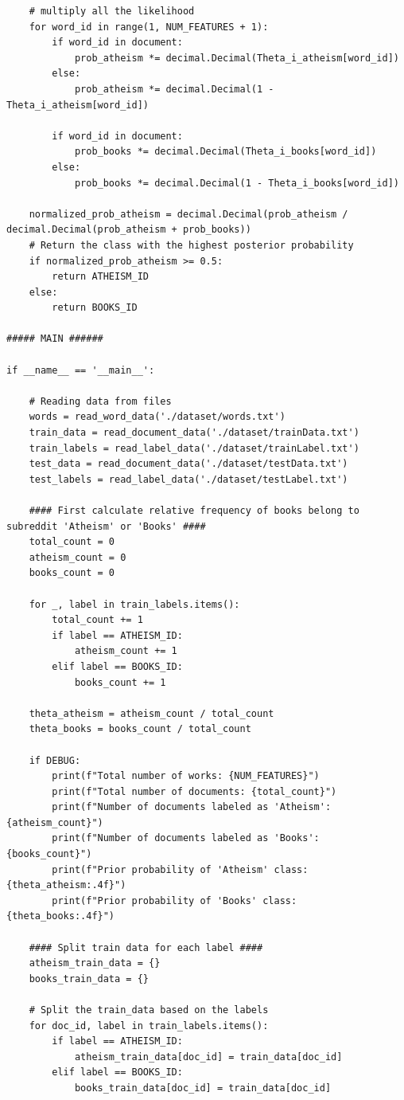 \documentclass[12pt]{article}
\begin{document}
\begin{enumerate}
\begin{lstlisting}
    # multiply all the likelihood
    for word_id in range(1, NUM_FEATURES + 1):
        if word_id in document:
            prob_atheism *= decimal.Decimal(Theta_i_atheism[word_id])
        else:
            prob_atheism *= decimal.Decimal(1 - Theta_i_atheism[word_id])
            
        if word_id in document:
            prob_books *= decimal.Decimal(Theta_i_books[word_id])
        else:
            prob_books *= decimal.Decimal(1 - Theta_i_books[word_id])
    
    normalized_prob_atheism = decimal.Decimal(prob_atheism / decimal.Decimal(prob_atheism + prob_books))
    # Return the class with the highest posterior probability
    if normalized_prob_atheism >= 0.5:
        return ATHEISM_ID
    else:
        return BOOKS_ID

##### MAIN ######

if __name__ == '__main__':
    
    # Reading data from files
    words = read_word_data('./dataset/words.txt')
    train_data = read_document_data('./dataset/trainData.txt')
    train_labels = read_label_data('./dataset/trainLabel.txt')
    test_data = read_document_data('./dataset/testData.txt')
    test_labels = read_label_data('./dataset/testLabel.txt')
    
    #### First calculate relative frequency of books belong to subreddit 'Atheism' or 'Books' ####
    total_count = 0
    atheism_count = 0
    books_count = 0

    for _, label in train_labels.items():
        total_count += 1
        if label == ATHEISM_ID:
            atheism_count += 1
        elif label == BOOKS_ID:
            books_count += 1
    
    theta_atheism = atheism_count / total_count
    theta_books = books_count / total_count
    
    if DEBUG:
        print(f"Total number of works: {NUM_FEATURES}")
        print(f"Total number of documents: {total_count}")
        print(f"Number of documents labeled as 'Atheism': {atheism_count}")
        print(f"Number of documents labeled as 'Books': {books_count}")
        print(f"Prior probability of 'Atheism' class: {theta_atheism:.4f}")
        print(f"Prior probability of 'Books' class: {theta_books:.4f}")
    
    #### Split train data for each label ####
    atheism_train_data = {}
    books_train_data = {}
    
    # Split the train_data based on the labels
    for doc_id, label in train_labels.items():
        if label == ATHEISM_ID:
            atheism_train_data[doc_id] = train_data[doc_id]
        elif label == BOOKS_ID:
            books_train_data[doc_id] = train_data[doc_id]
            

\end{lstlisting}
\end{enumerate}
\end{document}
